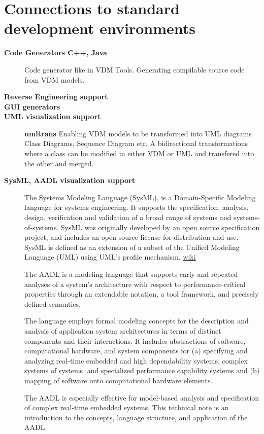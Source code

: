 \documentclass[11pt,a4paper,oneside]{report}
\begin{document}
\section{Connections to standard development environments}
\begin{description}
	\item[\textbf{Code Generators C++, Java}] Code generator like in VDM Tools. Generating compilable source code from VDM models.

	\item[\textbf{Reverse Engineering support}] 

	\item[\textbf{GUI generators}]  
     
	\item[\textbf{UML visualization support}] \textbf{umltrans}
Enabling VDM models to be transformed into UML diagrams Class Diagrams, Sequence Diagram etc. A bidirectional transformations where a class can be modified in either VDM or UML and transfered into the other and merged.
	\item[\textbf{SysML, AADL visualization support}] 
The Systems Modeling Language (SysML), is a Domain-Specific Modeling language for systems engineering. It supports the specification, analysis, design, verification and validation of a broad range of systems and systems-of-systems. SysML was originally developed by an open source specification project, and includes an open source license for distribution and use. SysML is defined as an extension of a subset of the Unified Modeling Language (UML) using UML's profile mechanism. \href{http://en.wikipedia.org/wiki/Systems_Modeling_Language}{wiki}

The AADL is a modeling language that supports early and repeated analyses of a system's architecture with respect to performance-critical properties through an extendable notation, a tool framework, and precisely defined semantics.

The language employs formal modeling concepts for the description and analysis of application system architectures in terms of distinct components and their interactions. It includes abstractions of software, computational hardware, and system components for (a) specifying and analyzing real-time embedded and high dependability systems, complex systems of systems, and specialized performance capability systems and (b) mapping of software onto computational hardware elements.

The AADL is especially effective for model-based analysis and specification of complex real-time embedded systems. This technical note is an introduction to the concepts, language structure, and application of the AADL

\end{description}
\end{document}
